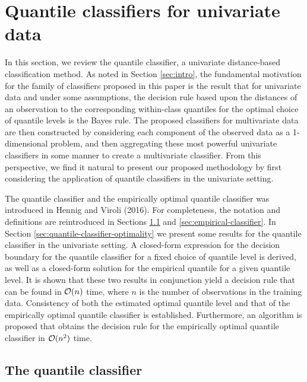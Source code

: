 
\section{Quantile classifiers for univariate data}
\label{sec:univariate-classifier}

In this section, we review the quantile classifier, a univariate distance-based
classification method.  As noted in Section \ref{sec:intro}, the fundamental
motivation for the family of classifiers proposed in this paper is the result
that for univariate data and under some assumptions, the decision rule based
upon the distances of an observation to the corresponding within-class quantiles
for the optimal choice of quantile levels is the Bayes rule.  The proposed
classifiers for multivariate data are then constructed by considering each
component of the observed data as a 1-dimensional problem, and then aggregating
these most powerful univariate classifiers in some manner to create a
multivariate classifier.  From this perspective, we find it natural to present
our proposed methodology by first considering the application of quantile
classifiers in the univariate setting.

The quantile classifier and the empirically optimal quantile classifier was
introduced in Hennig and Viroli (2016).  For completeness, the notation and
definitions are reintroduced in Sections \ref{sec:quantile-classifier} and
\ref{sec:empirical-classifier}.  In Section
\ref{sec:quantile-classifier-optimality} we present some results for the
quantile classifier in the univariate setting.  A closed-form expression for the
decision boundary for the quantile classifier for a fixed choice of quantile
level is derived, as well as a closed-form solution for the empirical quantile
for a given quantile level.  It is shown that these two results in conjunction
yield a decision rule that can be found in $\mathcal{O}(n)$ time, where $n$ is the
number of observations in the training data.  Consistency of both the estimated
optimal quantile level and that of the empirically optimal quantile classifier
is established.  Furthermore, an algorithm is proposed that obtains the decision
rule for the empirically optimal quantile classifier in $\mathcal{O}(n^2)$ time.




\subsection{The quantile classifier}
\label{sec:quantile-classifier}

